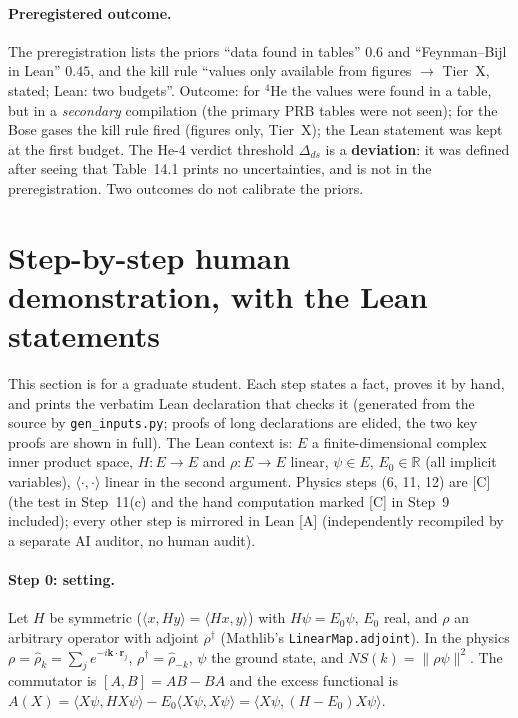 \documentclass[11pt]{article}
\theoremstyle{remark}
\newcommand{\R}{\mathbb{R}}
\newcommand{\tier}[1]{\textsf{[#1]}}
\newcommand{\lean}[1]{\texttt{#1}}
\newcommand{\rhoK}{\hat\rho_k}
\newcommand{\ip}[2]{\langle #1,#2\rangle}
\begin{document}
\paragraph{Preregistered outcome.} The preregistration lists the priors ``data found in tables'' $0.6$ and ``Feynman--Bijl in
Lean'' $0.45$, and the kill rule ``values only available from figures $\to$ Tier~X, stated; Lean: two budgets''. Outcome: for
$^4$He the values were found in a table, but in a \emph{secondary} compilation (the primary PRB tables were not seen); for the
Bose gases the kill rule fired (figures only, Tier~X); the Lean statement was kept at the first budget. The He-4 verdict threshold $\Delta_{ds}$
is a \textbf{deviation}: it was defined after seeing that Table~14.1 prints no uncertainties, and is not in the preregistration.
Two outcomes do not calibrate the priors.

\section{Step-by-step human demonstration, with the Lean statements}\label{sec:human}
This section is for a graduate student. Each step states a fact, proves it by hand, and prints the verbatim Lean declaration
that checks it (generated from the source by \texttt{gen\_inputs.py}; proofs of long declarations are elided, the two key
proofs are shown in full). The Lean context is: $E$ a finite-dimensional complex inner product space, $H:E\to E$ and
$\rho:E\to E$ linear, $\psi\in E$, $E_0\in\R$ (all implicit variables), $\ip{\cdot}{\cdot}$ linear in the second argument.
Physics steps (6, 11, 12) are \tier{C} (the test in Step~11(c) and the hand computation marked \tier{C} in Step~9 included); every other step is mirrored in Lean \tier{A} (independently recompiled by a separate AI auditor, no human audit).

\paragraph{Step 0: setting.} Let $H$ be symmetric ($\ip{x}{Hy}=\ip{Hx}{y}$) with $H\psi=E_0\psi$, $E_0$ real, and $\rho$ an arbitrary operator
with adjoint $\rho^\dagger$ (Mathlib's \lean{LinearMap.adjoint}). In the physics $\rho=\rhoK=\sum_j e^{-i\mathbf k\cdot\mathbf r_j}$, $\rho^\dagger=\hat\rho_{-k}$,
$\psi$ the ground state, and $NS(k)=\|\rho\psi\|^2$. The commutator is $[A,B]=AB-BA$ and the excess functional is
$A(X)=\ip{X\psi}{HX\psi}-E_0\ip{X\psi}{X\psi}=\ip{X\psi}{(H-E_0)X\psi}$.

\end{document}
